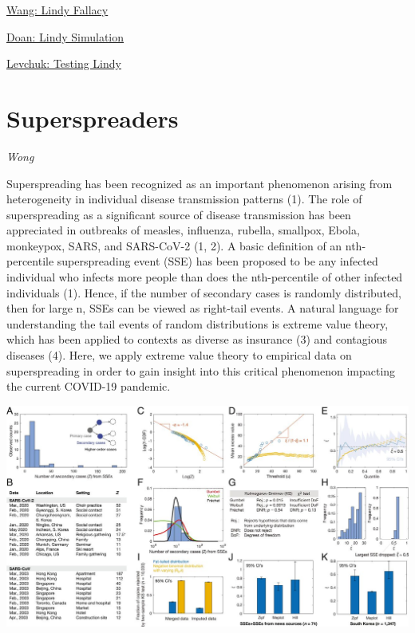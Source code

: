 \documentclass[
]{book}
\begin{document}
\href{https://cryptowords.github.io/the-statistical-fallacy-behind-the-lindy-effect}{Wang: Lindy Fallacy}

\href{https://towardsdatascience.com/a-statistical-rule-to-optimize-your-life-the-lindys-effect-96d2c75b080d}{Doan: Lindy Simulation}

\href{https://alevchuk.medium.com/statistical-testing-of-the-lindy-effect-with-real-data-4f55a5a9a2f0}{Levchuk: Testing Lindy}

\hypertarget{superspreaders}{%
\section{Superspreaders}\label{superspreaders}}

\emph{Wong}

Superspreading has been recognized as an important phenomenon arising from heterogeneity in individual disease transmission patterns (1). The role of superspreading as a significant source of disease transmission has been appreciated in outbreaks of measles, influenza, rubella, smallpox, Ebola, monkeypox, SARS, and SARS-CoV-2 (1, 2). A basic definition of an nth-percentile superspreading event (SSE) has been proposed to be any infected individual who infects more people than does the nth-percentile of other infected individuals (1). Hence, if the number of secondary cases is randomly distributed, then for large n, SSEs can be viewed as right-tail events. A natural language for understanding the tail events of random distributions is extreme value theory, which has been applied to contexts as diverse as insurance (3) and contagious diseases (4). Here, we apply extreme value theory to empirical data on superspreading in order to gain insight into this critical phenomenon impacting the current COVID-19 pandemic.

\includegraphics{fig/Wong_Superspreader.jpg}
\end{document}
